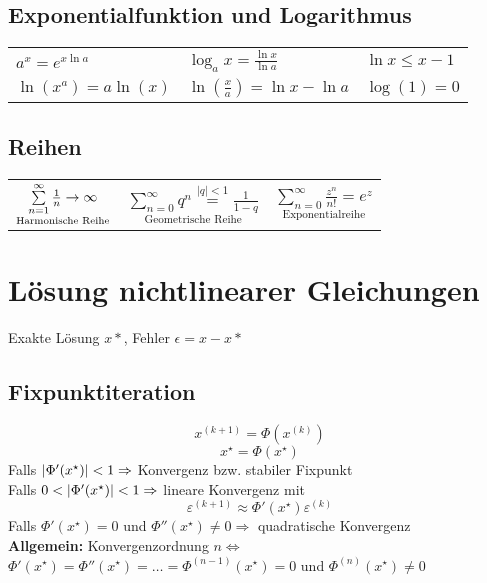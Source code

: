 \documentclass[german]{latex4ei/latex4ei_sheet}
\begin{document}
\begin{sectionbox}
\subsection{Exponentialfunktion und Logarithmus}
\begin{tabular*}{\columnwidth}{l@{\extracolsep\fill}ll}
	$a^x = e^{x \ln a}$ & $\log_a x = \frac{\ln x}{\ln a}$ & $\ln x \le x -1$\\
	$\ln(x^{a}) = a \ln(x)$ & $\ln(\frac{x}{a}) = \ln x - \ln a$ & $\log(1) = 0$\\
\end{tabular*}

\subsection{Reihen}
\begin{tabularx}{\columnwidth}{CCC}
$\underset{\text{Harmonische Reihe}}{\sum\limits_{n=1}^\infty \frac{1}{n} \rightarrow \infty}$ & $\underset{\text{Geometrische Reihe}}{\sum\limits_{n=0}^\infty q^n \stackrel{|q|<1}= \frac{1}{1-q}}$ & $\underset{\text{Exponentialreihe}}{\sum\limits_{n = 0}^{\infty} \frac{z^n}{n!} = e^z}$
\end{tabularx}
\end{sectionbox}

\section{Lösung nichtlinearer Gleichungen}
Exakte Lösung $x*$, Fehler $\epsilon=x-x*$
\begin{sectionbox}
\subsection{Fixpunktiteration}
\begin{equation*}
	x^{(k + 1)} = \Phi(x^{(k)})
\end{equation*}
\begin{equation*}
	x^\star = \Phi(x^\star)
\end{equation*}
Falls $\left\vert\Phi'(x^\star)\right\vert < 1 \Rightarrow$ Konvergenz bzw. stabiler Fixpunkt \\
Falls $0 < \left\vert\Phi'(x^\star)\right\vert < 1 \Rightarrow$ lineare Konvergenz mit
\begin{equation*}
	\varepsilon^{(k + 1)} \approx \Phi'(x^\star) \varepsilon^{(k)}
\end{equation*}
Falls $\Phi'(x^\star) = 0$ und $\Phi''(x^\star) \ne 0 \Rightarrow$ quadratische Konvergenz \\
\textbf{Allgemein:} Konvergenzordnung $n \Leftrightarrow$\\ $\Phi'(x^\star) = \Phi''(x^\star) = \ldots = \Phi^{(n - 1)}(x^\star) = 0$ und $\Phi^{(n)}(x^\star) \ne 0$
\end{sectionbox}
\end{document}
